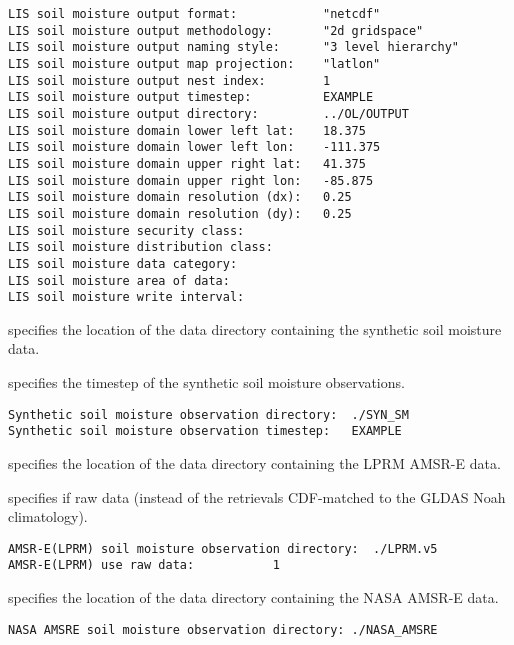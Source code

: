  \begin{Verbatim}[frame=single]
LIS soil moisture output format:            "netcdf"
LIS soil moisture output methodology:       "2d gridspace"
LIS soil moisture output naming style:      "3 level hierarchy"
LIS soil moisture output map projection:    "latlon"
LIS soil moisture output nest index:        1
LIS soil moisture output timestep:          EXAMPLE
LIS soil moisture output directory:         ../OL/OUTPUT
LIS soil moisture domain lower left lat:    18.375
LIS soil moisture domain lower left lon:    -111.375
LIS soil moisture domain upper right lat:   41.375
LIS soil moisture domain upper right lon:   -85.875
LIS soil moisture domain resolution (dx):   0.25
LIS soil moisture domain resolution (dy):   0.25
LIS soil moisture security class:
LIS soil moisture distribution class:
LIS soil moisture data category:
LIS soil moisture area of data:
LIS soil moisture write interval:
 \end{Verbatim}

 
 specifies the location of the data directory containing the synthetic 
 soil moisture data.

  specifies
 the timestep of the synthetic soil moisture observations.
 

 \begin{Verbatim}[frame=single]
Synthetic soil moisture observation directory:  ./SYN_SM
Synthetic soil moisture observation timestep:   EXAMPLE
 \end{Verbatim}

 
 specifies the location of the data directory containing the LPRM 
 AMSR-E data.

 specifies if raw data (instead of the retrievals CDF-matched to the
 GLDAS Noah climatology).
 

 \begin{Verbatim}[frame=single]
AMSR-E(LPRM) soil moisture observation directory:  ./LPRM.v5
AMSR-E(LPRM) use raw data:           1
 \end{Verbatim}

 
 specifies the location of the data directory containing the NASA 
 AMSR-E data.

 

 \begin{Verbatim}[frame=single]
NASA AMSRE soil moisture observation directory: ./NASA_AMSRE
 \end{Verbatim}


